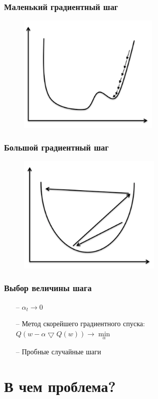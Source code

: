 \documentclass[10pt]{beamer}
\begin{document}
\begin{frame}\frametitle{Маленький градиентный шаг}
	\begin{figure}[htbp]
	  \includegraphics[height=160pt, keepaspectratio = true]{images/learning_rate_small}
	\end{figure}
\end{frame}

\begin{frame}\frametitle{Большой градиентный шаг}
	\begin{figure}[htbp]
	  \includegraphics[height=160pt, keepaspectratio = true]{images/learning_rate_large}
	\end{figure}
\end{frame}

\begin{frame}\frametitle{Выбор величины шага}
	\begin{itemize}
		\item[--] $\alpha_t \rightarrow 0$\\
		\item[--] Метод скорейшего градиентного спуска:\\
		$Q(w - \alpha \bigtriangledown Q(w)) \rightarrow \min\limits_{\alpha}$
		\item[--] Пробные случайные шаги
	\end{itemize}
\end{frame}

\section{В чем проблема?}
\end{document}
